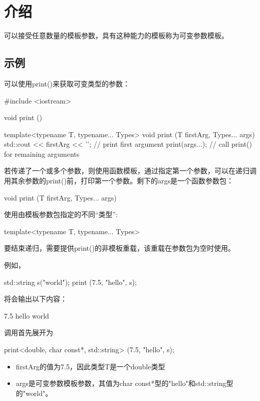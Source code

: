\section{介绍}


可以接受任意数量的模板参数，具有这种能力的模板称为可变参数模板。

\subsection{示例}

可以使用print()来获取可变类型的参数：

\begin{cpp}
#include <iostream>

void print () {}

template<typename T, typename... Types>
void print (T firstArg, Types... args) {
	std::cout << firstArg << '\n'; // print first argument
	print(args...); // call print() for remaining arguments
}
\end{cpp}

若传递了一个或多个参数，则使用函数模板，通过指定第一个参数，可以在递归调用其余参数的print()前，打印第一个参数。剩下的args是一个函数参数包：

\begin{cpp}
void print (T firstArg, Types... args)
\end{cpp}

使用由模板参数包指定的不同“类型”:

\begin{cpp}
template<typename T, typename... Types>
\end{cpp}

要结束递归，需要提供print()的非模板重载，该重载在参数包为空时使用。

例如，

\begin{cpp}
std::string s("world");
print (7.5, "hello", s);
\end{cpp}

将会输出以下内容：

\begin{shell}
7.5
hello
world
\end{shell}

调用首先展开为

\begin{cpp}
print<double, char const*, std::string> (7.5, "hello", s);
\end{cpp}

\begin{itemize}
\item 
firstArg的值为7.5，因此类型T是一个double类型

\item 
args是可变参数模板参数，其值为char const*型的"hello"和std::string型的"world"。
\end{itemize}

